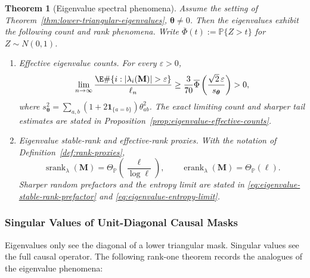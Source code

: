 \documentclass{article}
\newcommand{\Prob}{\mathbb{P}}
\newcommand{\srank}{\operatorname{srank}}
\newcommand{\erank}{\operatorname{erank}}
\newcommand{\bM}{\mathbf{M}}
\newcommand{\barPhi}{\overline{\Phi}}
\newtheorem{theorem}{Theorem}
\theoremstyle{definition}
\theoremstyle{remark}
\begin{document}
\begin{theorem}[Eigenvalue spectral phenomena]
Assume the setting of Theorem~\ref{thm:lower-triangular-eigenvalues},
$\boldsymbol{\theta}\neq0$.  Then the eigenvalues exhibit the
following count and rank phenomena.  Write
$\barPhi(t):=\Prob\{Z>t\}$ for $Z\sim N(0,1)$.

\begin{enumerate}
\item[(i)] Effective eigenvalue counts.  For every $\varepsilon>0$,
\begin{equation}
    \lim_{n\to\infty}
    \frac{\E\#\{i:|\lambda_i(\bM)|>\varepsilon\}}{\ell_n}
    \geq
    \frac{3}{70}
    \barPhi\left(
    \frac{\sqrt2\,\varepsilon}{s_{\boldsymbol{\theta}}}
    \right)>0,
    \label{eq:expected-effective-count}
\end{equation}
where
$s_{\boldsymbol{\theta}}^2=\sum_{a,b}
(1+2\mathbf 1_{\{a=b\}})\theta_{ab}^2$.  The exact limiting count and sharper
tail estimates are stated in Proposition~\ref{prop:eigenvalue-effective-counts}.

\item[(ii)] Eigenvalue stable-rank and effective-rank proxies.  With the
notation of Definition~\ref{def:rank-proxies},
\begin{equation}
    \srank_{\lambda}(\bM)
    =
    \Theta_{\Prob}\left(\frac{\ell}{\log\ell}\right),
    \qquad
    \erank_{\lambda}(\bM)=\Theta_{\Prob}(\ell).
    \label{eq:eigenvalue-rank-summary}
\end{equation}
Sharper random prefactors and the entropy limit are stated in
\eqref{eq:eigenvalue-stable-rank-prefactor} and
\eqref{eq:eigenvalue-entropy-limit}.
\end{enumerate}
\label{thm:eigenvalue-spectral-phenomena}
\end{theorem}

\subsubsection{Singular Values of Unit-Diagonal Causal Masks}

Eigenvalues only see the diagonal of a lower triangular mask.  Singular values
see the full causal operator.  The following rank-one theorem records the
analogues of the eigenvalue phenomena:
\end{document}
